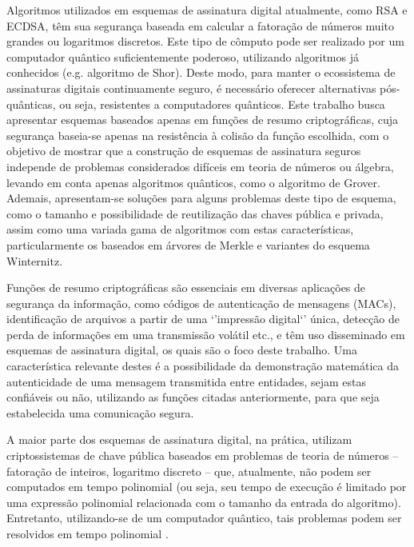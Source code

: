 \documentclass{article}
\title{}
\author{}
\date{Novembro de 2017}
\begin{document}
\maketitle

Algoritmos utilizados em esquemas de assinatura digital atualmente, como RSA
e ECDSA, têm sua segurança baseada em calcular a fatoração de números muito
grandes ou logaritmos discretos. Este tipo de cômputo pode ser realizado por
um computador quântico suficientemente poderoso, utilizando algoritmos já
conhecidos (e.g. algoritmo de Shor). Deste modo, para manter o ecossistema de
assinaturas digitais continuamente seguro, é necessário oferecer alternativas
pós-quânticas, ou seja, resistentes a computadores quânticos. Este trabalho
busca apresentar esquemas baseados apenas em funções de resumo
criptográficas, cuja segurança baseia-se apenas na resistência à colisão da
função escolhida, com o objetivo de mostrar que a construção de esquemas de
assinatura seguros independe de problemas considerados difíceis em teoria de
números ou álgebra, levando em conta apenas algoritmos quânticos, como o
algoritmo de Grover. Ademais, apresentam-se soluções para alguns problemas
deste tipo de esquema, como o tamanho e possibilidade de reutilização das
chaves pública e privada, assim como uma variada gama de algoritmos com estas
características, particularmente os baseados em árvores de Merkle e variantes
do esquema Winternitz.

Funções de resumo criptográficas são essenciais em diversas aplicações de
segurança da informação, como códigos de autenticação de mensagens (MACs),
identificação de arquivos a partir de uma `'impressão digital`' única, detecção
de perda de informações em uma transmissão volátil etc., e têm uso disseminado
em esquemas de assinatura digital, os quais são o foco deste trabalho. Uma
característica relevante destes é a possibilidade da demonstração matemática da
autenticidade de uma mensagem transmitida entre entidades, sejam estas
confiáveis ou não, utilizando as funções citadas anteriormente, para que seja
estabelecida uma comunicação segura.

A maior parte dos esquemas de assinatura digital, na prática, utilizam
criptossistemas de chave pública baseados em problemas de teoria de números --
fatoração de inteiros, logaritmo discreto -- que, atualmente, não podem ser
computados em tempo polinomial (ou seja, seu tempo de execução é limitado por
uma expressão polinomial relacionada com o tamanho da entrada do algoritmo).
Entretanto, utilizando-se de um computador quântico, tais problemas podem ser
resolvidos em tempo polinomial \cite{shor1999polynomial}.
\end{document}
